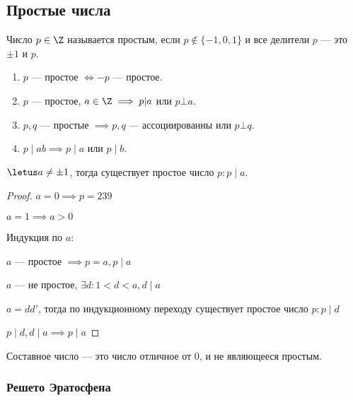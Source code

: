\subsection{Простые числа}

\begin{defn}
    Число $p \in \Z$ называется простым, если $p \notin \{-1, 0, 1\}$ и все делители $p$ --- это $\pm 1$ и $p$.
\end{defn}

\begin{prop}
    \begin{enumerate}
        \item $p$ --- простое $\iff -p$ --- простое.
        
        \item $p$ --- простое, $a \in \Z \implies p | a$ или $p \bot a$.
        
        \item $p, q$ --- простые $\implies p, q$ --- ассоциированны или $p \bot q$.
        
        \item $p \mid ab \implies p \mid a$ или $p \mid b$. 
    \end{enumerate}
\end{prop}

\begin{theorem-non}
    $\letus a \neq \pm 1$, тогда существует простое число $p : p \mid a$.
\end{theorem-non}

\begin{proof}
    $a = 0 \implies p = 239$
    
    $a = 1 \implies a > 0$
    
    Индукция по $a$:
    
    $a$ --- простое $\implies p = a, p \mid a$
    
    $a$ --- не простое, $\exists d : 1 < d < a, d \mid a$
    
    $a = dd'$, тогда по индукционному переходу существует простое число $p : p \mid d$
    
    $p \mid d, d \mid a \implies p \mid a$
\end{proof}

\begin{defn}
    Составное число --- это число отличное от 0, и не являющееся простым.
\end{defn}

\subsubsection*{Решето Эратосфена}

